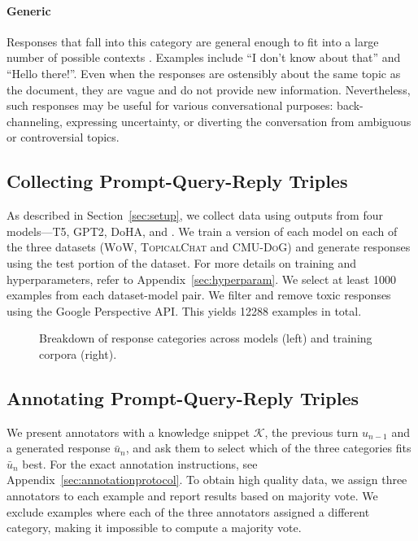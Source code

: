 \paragraph{Generic} Responses that fall into this category are general enough to fit into a large number of possible contexts  \cite{li2016diversity}. Examples include ``I don't know about that'' and ``Hello there!''. Even when the responses are ostensibly about the same topic as the document, they are vague and do not provide new information. 
Nevertheless, such responses may be useful for various conversational purposes: back-channeling, expressing uncertainty, or diverting the conversation from ambiguous or controversial topics.





\subsection{Collecting Prompt-Query-Reply Triples}
As described in Section~\ref{sec:setup}, we collect data using outputs from four models---T5, GPT2, DoHA, and \CTRL{}. We train a version of each model on each of the three datasets (\textsc{WoW}, \textsc{TopicalChat} and \textsc{CMU-DoG}) and generate responses using the test portion of the dataset. For more details on training and hyperparameters, refer to Appendix~\ref{sec:hyperparam}. We select at least 1000 examples from each dataset-model pair.
We filter and remove toxic responses using the Google Perspective API. This yields 12288 examples in total.
\begin{figure*}
\centering
  
    \caption{\small Breakdown of \begindata{} response categories across models (left) and training corpora (right).}
    \label{fig:breakdown_gold}
\end{figure*} 
\subsection{Annotating  Prompt-Query-Reply Triples}
We present annotators with a knowledge snippet $\mathcal{K}$, the previous turn $u_{n-1}$ and a generated response $\bar{u}_{n}$, and ask them to select which of the three categories fits $\bar{u}_{n}$ best. 
For the exact annotation instructions, see Appendix~\ref{sec:annotationprotocol}.
To obtain high quality data, we assign three annotators to each example and report results based on majority vote. We exclude examples where each of the three annotators assigned a different category, making it impossible to compute a majority vote.

